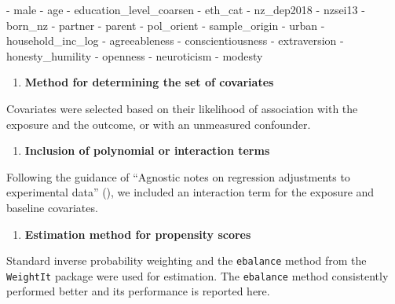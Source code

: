 \documentclass[
  singlecolumn,
  9pt]{scrartcl}
\newenvironment{Shaded}{\begin{snugshade}}{\end{snugshade}}
\newcommand{\NormalTok}[1]{\textcolor[rgb]{0.00,0.23,0.31}{#1}}
\newcommand{\SpecialStringTok}[1]{\textcolor[rgb]{0.13,0.47,0.30}{#1}}
\providecommand{\tightlist}{%
  \setlength{\itemsep}{0pt}\setlength{\parskip}{0pt}}\usepackage{longtable,booktabs,array}
\begin{document}
\begin{Shaded}
\begin{Highlighting}[]
\SpecialStringTok{{-} }\NormalTok{male}
\SpecialStringTok{{-} }\NormalTok{age}
\SpecialStringTok{{-} }\NormalTok{education\_level\_coarsen}
\SpecialStringTok{{-} }\NormalTok{eth\_cat}
\SpecialStringTok{{-} }\NormalTok{nz\_dep2018}
\SpecialStringTok{{-} }\NormalTok{nzsei13}
\SpecialStringTok{{-} }\NormalTok{born\_nz}
\SpecialStringTok{{-} }\NormalTok{partner}
\SpecialStringTok{{-} }\NormalTok{parent}
\SpecialStringTok{{-} }\NormalTok{pol\_orient}
\SpecialStringTok{{-} }\NormalTok{sample\_origin}
\SpecialStringTok{{-} }\NormalTok{urban}
\SpecialStringTok{{-} }\NormalTok{household\_inc\_log}
\SpecialStringTok{{-} }\NormalTok{agreeableness}
\SpecialStringTok{{-} }\NormalTok{conscientiousness}
\SpecialStringTok{{-} }\NormalTok{extraversion}
\SpecialStringTok{{-} }\NormalTok{honesty\_humility}
\SpecialStringTok{{-} }\NormalTok{openness}
\SpecialStringTok{{-} }\NormalTok{neuroticism}
\SpecialStringTok{{-} }\NormalTok{modesty}
\end{Highlighting}
\end{Shaded}

\begin{enumerate}
\def\labelenumi{\arabic{enumi}.}
\setcounter{enumi}{2}
\tightlist
\item
  \textbf{Method for determining the set of covariates}
\end{enumerate}

Covariates were selected based on their likelihood of association with
the exposure and the outcome, or with an unmeasured confounder.

\begin{enumerate}
\def\labelenumi{\arabic{enumi}.}
\setcounter{enumi}{3}
\tightlist
\item
  \textbf{Inclusion of polynomial or interaction terms}
\end{enumerate}

Following the guidance of {``Agnostic notes on regression adjustments to
experimental data''} (), we included an
interaction term for the exposure and baseline covariates.

\begin{enumerate}
\def\labelenumi{\arabic{enumi}.}
\setcounter{enumi}{4}
\tightlist
\item
  \textbf{Estimation method for propensity scores}
\end{enumerate}

Standard inverse probability weighting and the \texttt{ebalance} method
from the \texttt{WeightIt} package were used for estimation. The
\texttt{ebalance} method consistently performed better and its
performance is reported here.
\end{document}
